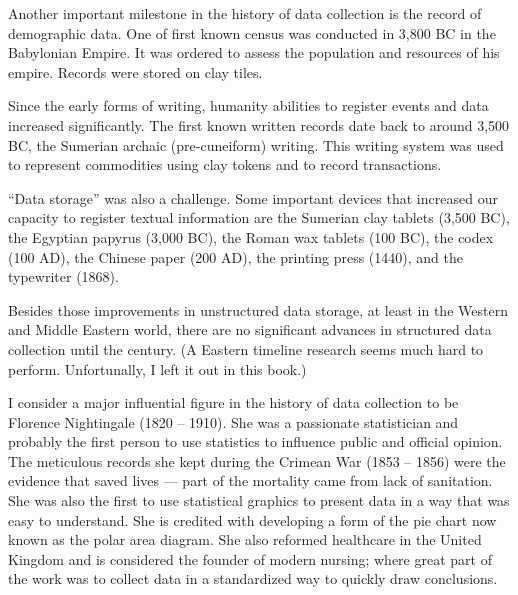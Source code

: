 Another important milestone in the history of data collection is the record of
demographic data.  One of first known census was conducted in 3,800 BC in the Babylonian
Empire.  It was ordered to assess the population and resources of
his empire.  Records were stored on  clay  tiles.

Since the early forms of writing, humanity abilities to register events and data
increased significantly.  The first known written records date back to around 3,500 BC, the
Sumerian archaic (pre-cuneiform) writing.  This writing system was used to represent
commodities using clay tokens and to record transactions.

``Data storage'' was also a challenge.  Some important devices that increased our capacity
to register textual information are the Sumerian clay tablets (3,500 BC), the Egyptian
papyrus (3,000 BC), the Roman wax tablets (100 BC), the codex
(100 AD), the Chinese paper (200 AD), the printing press (1440), and the typewriter (1868).


Besides those improvements in unstructured data storage, at least in the Western and
Middle Eastern world, there are no significant advances in structured data collection
until the  century.  (A Eastern timeline research seems much hard to perform.
Unfortunally, I left it out in this book.)

I consider a major influential figure in the history of data
collection to be Florence Nightingale (1820 -- 1910).  She was a passionate statistician
and probably the first person to use statistics to influence public and official
opinion.  The meticulous records she kept during the Crimean War
(1853 -- 1856) were the evidence that saved lives --- part of the mortality came from lack
of sanitation.  She was also the first to use
statistical graphics to present data in a way that was easy to understand.  She is
credited with developing a form of the pie chart now known as the polar area
diagram.  She also reformed healthcare in the United Kingdom and
is considered the founder of modern nursing; where great part of the work was to collect
data in a standardized way to quickly draw conclusions.

